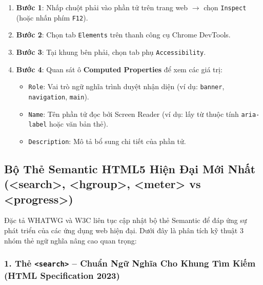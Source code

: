 \documentclass[11pt,oneside]{book}
\newcommand{\codeinline}[1]{\textcolor{accentOrange}{\texttt{#1}}}
\begin{document}
\begin{center}
\begin{tcolorbox}[
    enhanced, colback=codeBg!40!white, colframe=primaryBlue!30, arc=8pt, boxrule=0.8pt,
    top=12pt, bottom=12pt, left=14pt, right=14pt,
    title={\sffamily\bfseries\small\color{primaryBlue} QUY TRÌNH 4 BƯỚC DEBUG ACCESSIBILITY TREE TRÊN CHROME DEVTOOLS}
]
\begin{enumerate}[leftmargin=1.5em, itemsep=4pt, parsep=0pt]
    \item \textbf{Bước 1}: Nhấp chuột phải vào phần tử trên trang web $\rightarrow$ chọn \codeinline{Inspect} (hoặc nhấn phím \codeinline{F12}).
    \item \textbf{Bước 2}: Chọn tab \codeinline{Elements} trên thanh công cụ Chrome DevTools.
    \item \textbf{Bước 3}: Tại khung bên phải, chọn tab phụ \codeinline{Accessibility}.
    \item \textbf{Bước 4}: Quan sát ô \textbf{Computed Properties} để xem các giá trị:
    \begin{itemize}[leftmargin=1.2em, itemsep=2pt, parsep=0pt]
        \item \codeinline{Role}: Vai trò ngữ nghĩa trình duyệt nhận diện (ví dụ: \codeinline{banner}, \codeinline{navigation}, \codeinline{main}).
        \item \codeinline{Name}: Tên phần tử đọc bởi Screen Reader (ví dụ: lấy từ thuộc tính \codeinline{aria-label} hoặc văn bản thẻ).
        \item \codeinline{Description}: Mô tả bổ sung chi tiết của phần tử.
    \end{itemize}
\end{enumerate}
\end{tcolorbox}
\end{center}
\Needspace*{120pt}
\subsection{Bộ Thẻ Semantic HTML5 Hiện Đại Mới Nhất (<search>, <hgroup>, <meter> vs <progress>)}

Đặc tả WHATWG và W3C liên tục cập nhật bộ thẻ Semantic để đáp ứng sự phát triển của các ứng dụng web hiện đại. Dưới đây là phân tích kỹ thuật 3 nhóm thẻ ngữ nghĩa nâng cao quan trọng:

\subsubsection{1. Thẻ \codeinline{<search>} -- Chuẩn Ngữ Nghĩa Cho Khung Tìm Kiếm (HTML Specification 2023)}
\end{document}
